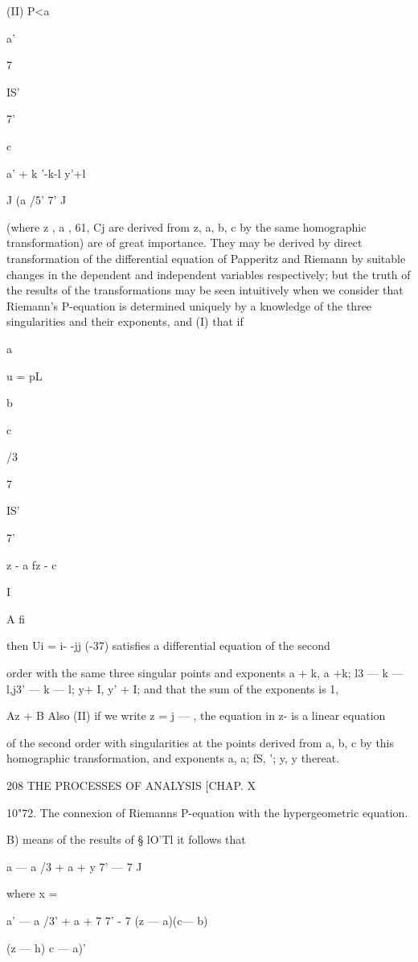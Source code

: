 (II) P<a

a'

  

7

IS'

7'

c

a' + k '-k-l y'+l

J (a /5' 7' J

(where z , a , 61, Cj are derived from z, a, b, c by the same
homographic transformation) are of great importance. They may be
derived by direct transformation of the differential equation of
Papperitz and Riemann by suitable changes in the dependent and
independent variables respectively; but the truth of the results of
the transformations may be seen intuitively when we consider that
Riemann's P-equation is determined uniquely by a knowledge of the
three singularities and their exponents, and (I) that if

a

u = pL

b

c

/3

7

IS'

7'

z - a\* fz - c\

I

A fi

then Ui = i- -jj (-37) satisfies a differential equation of the second

order with the same three singular points and exponents a + k, a +k;
l3 — k — l,j3' — k — l; y+ I, y' + I; and that the sum of the
exponents is 1,

Az + B Also (II) if we write z = j — , the equation in z- is a linear
equation

of the second order with singularities at the points derived from a,
b, c by this homographic transformation, and exponents a, a; fS, ';
y, y thereat.

208 THE PROCESSES OF ANALYSIS [CHAP. X

10"72. The connexion of Riemanns P-equation with the hypergeometric
equation.

B) means of the results of § lO'Tl it follows that

 a — a /3 + a + y 7' — 7 J

where x =

a' — a /3' + a + 7 7' - 7 (z — a)(c— b)

(z — h) c — a)'


